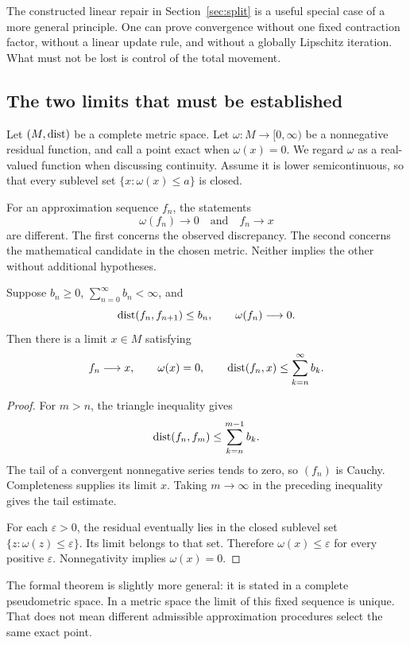 \label{sec:variable-exactification}
The constructed linear repair in Section~\ref{sec:split} is a useful special case of a more general principle. One can prove convergence without one fixed contraction factor, without a linear update rule, and without a globally Lipschitz iteration. What must not be lost is control of the total movement.

\subsection{The two limits that must be established}
Let \((M,\operatorname{dist})\) be a complete metric space. Let \(\omega:M\to[0,\infty)\) be a nonnegative residual function, and call a point exact when \(\omega(x)=0\). We regard \(\omega\) as a real-valued function when discussing continuity. Assume it is lower semicontinuous, so that every sublevel set \(\{x:\omega(x)\le a\}\) is closed.

For an approximation sequence \(f_n\), the statements
\[
 \omega(f_n)\longrightarrow0
 \quad\text{and}\quad
 f_n\longrightarrow x
\]
are different. The first concerns the observed discrepancy. The second concerns the mathematical candidate in the chosen metric. Neither implies the other without additional hypotheses.

\begin{theorem}\label{KS71}
Suppose \(b_n\ge0\), \(\sum_{n=0}^{\infty}b_n<\infty\), and
\[
 \operatorname{dist}(f_n,f_{n+1})\le b_n,\qquad \omega(f_n)\longrightarrow0.
\]
Then there is a limit \(x\in M\) satisfying
\[
 f_n\longrightarrow x,\qquad\omega(x)=0,\qquad
 \operatorname{dist}(f_n,x)\le\sum_{k=n}^{\infty}b_k.
\]
\end{theorem}
\begin{proof}
For \(m>n\), the triangle inequality gives
\[
 \operatorname{dist}(f_n,f_m)\le\sum_{k=n}^{m-1}b_k.
\]
The tail of a convergent nonnegative series tends to zero, so \((f_n)\) is Cauchy. Completeness supplies its limit \(x\). Taking \(m\to\infty\) in the preceding inequality gives the tail estimate.

For each \(\varepsilon>0\), the residual eventually lies in the closed sublevel set \(\{z:\omega(z)\le\varepsilon\}\). Its limit belongs to that set. Therefore \(\omega(x)\le\varepsilon\) for every positive \(\varepsilon\). Nonnegativity implies \(\omega(x)=0\).
\end{proof}
The formal theorem is slightly more general: it is stated in a complete pseudometric space. In a metric space the limit of this fixed sequence is unique. That does not mean different admissible approximation procedures select the same exact point.

